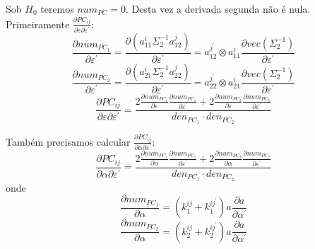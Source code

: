 \documentclass[a4paper,10pt]{article}
\begin{document}
Sob $H_0$ teremos $num_{PC} = 0$. Desta vez a derivada segunda não é nula. Primeiramente $\frac{\partial PC_{ij}}{\partial \varepsilon \partial \varepsilon^{'}}$:
\begin{equation}
\frac{\partial num_{PC_{1}}}{\partial \varepsilon^{'}} = \frac{\partial (a_{11}^{i} \Sigma_{2}^{-1} a_{12}^{j})}{\partial \varepsilon^{'}} = a_{12}^{j^{'}} \otimes a_{11}^{i} \frac{\partial vec(\Sigma_{2}^{-1})}{\partial \varepsilon^{'}}
\end{equation}
\begin{equation}
\frac{\partial num_{PC_{2}}}{\partial \varepsilon^{'}} = \frac{\partial (a_{21}^{i} \Sigma_{2}^{-1} a_{22}^{j})}{\partial \varepsilon^{'}} = a_{22}^{j^{'}} \otimes a_{21}^{i} \frac{\partial vec(\Sigma_{2}^{-1})}{\partial \varepsilon^{'}}
\end{equation}
\begin{equation}
\frac{\partial PC_{ij}}{\partial \varepsilon \partial \varepsilon^{'}} = \frac{2 \frac{\partial num_{PC_{1}}}{\partial \varepsilon} \frac{\partial num_{PC_{1}}}{\partial \varepsilon^{'}} + 2 \frac{\partial num_{PC_{2}}}{\partial \varepsilon} \frac{\partial num_{PC_{2}}}{\partial \varepsilon^{'}}}{den_{PC_{1}} \cdot den_{PC_{2}}}
\end{equation}

Também precisamos calcular $\frac{\partial PC_{ij}}{\partial \alpha \partial \varepsilon^{'}}$:
\begin{equation}
\frac{\partial PC_{ij}}{\partial \alpha \partial \varepsilon^{'}} = \frac{2 \frac{\partial num_{PC_{1}}}{\partial \alpha} \frac{\partial num_{PC_{1}}}{\partial \varepsilon^{'}} + 2 \frac{\partial num_{PC_{2}}}{\partial \alpha} \frac{\partial num_{PC_{2}}}{\partial \varepsilon^{'}}}{den_{PC_{1}} \cdot den_{PC_{2}}}
\end{equation}
onde
\begin{equation}
\frac{\partial num_{PC_{1}}}{\partial \alpha} = (k_{1}^{ij} + k_{1}^{ij^{'}}) a \frac{\partial a}{\partial \alpha^{'}}
\end{equation}
\begin{equation}
\frac{\partial num_{PC_{2}}}{\partial \alpha} = (k_{2}^{ij} + k_{2}^{ij^{'}}) a \frac{\partial a}{\partial \alpha^{'}}
\end{equation}
\end{document}
